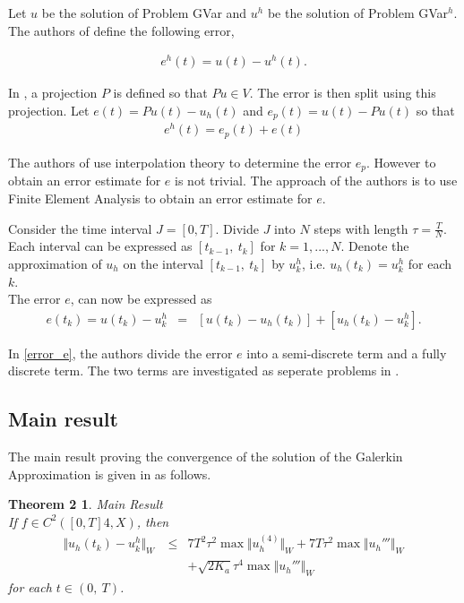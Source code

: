\documentclass[../../main.tex]{subfiles}
\begin{document}
Let $u$ be the solution of Problem GVar and $u^h$ be the solution of Problem GVar$^h$. The authors of \cite{BV13} define the following error,

\begin{eqnarray}
	e^h(t) = u(t) - u^h(t). \label{Error}
\end{eqnarray}

In \cite{BV13}, a projection $P$ is defined so that $Pu \in V$. The error is then split using this projection. Let $e(t) = Pu(t)- u_h(t)$ and $e_p(t) = u(t) - Pu(t)$ so that
\begin{eqnarray}
	e^h(t) = e_p(t) +e(t) \label{Error}
\end{eqnarray}

The authors of \cite{BV13} use interpolation theory to determine the error $e_p$. However to obtain an error estimate for $e$ is not trivial. The approach of the authors is to use Finite Element Analysis to obtain an error estimate for $e$.

Consider the time interval $J = [0,T]$. Divide $J$ into $N$ steps with length $\tau = \frac{T}{N}$. Each interval can be expressed as $[t_{k-1}, \ t_k]$ for $k = 1,...,N$. Denote the approximation of $u_h$ on the interval $[t_{k-1}, \ t_k]$ by $u_k^h$, i.e. $u_h(t_k) = u_k^h$ for each $k$.\\

The error $e$, can now be expressed as
\begin{eqnarray}
	e(t_k) = u(t_k) - u^h_k & = & [u(t_k)-u_h(t_k)] + [u_h(t_k) - u^h_k]. \label{error_e}
\end{eqnarray}

In \eqref{error_e}, the authors divide the error $e$ into a semi-discrete term and a fully discrete term. The two terms are investigated as seperate problems in \cite{BV13}.\\

\subsection{Main result}

The main result proving the convergence of the solution of the Galerkin Approximation is given in \cite{BV13} as follows.

\newtheorem*{DC_Thm5}{Theorem 2}
\begin{DC_Thm5}
	{Main Result}\\
	If $f\in C^{2}([0,T]4,X)$, then
	\begin{eqnarray*}
		\Vert u_{h}(t_{k})-u_{k}^{h}\Vert_{W}\ & \leq & 7T^{2}\tau^{2}\max\Vert u_{h}^{(4)}\Vert_{W}+7T\tau^{2}\max\Vert u_{h}'''\Vert_{W}\\
		& & + \sqrt{2K_{a}}\tau^{4}\max\Vert u_{h}'''\Vert_{W}
	\end{eqnarray*}
	for each $t\in(0,\ T)$.
\end{DC_Thm5}
\end{document}
